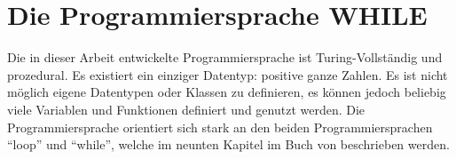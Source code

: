 \chapter{Die Programmiersprache WHILE} \label{chap:while}

Die in dieser Arbeit entwickelte Programmiersprache ist Turing-Vollständig und prozedural. Es existiert ein einziger Datentyp: positive ganze Zahlen. Es ist nicht möglich eigene Datentypen oder Klassen zu definieren, es können jedoch beliebig viele Variablen und Funktionen definiert und genutzt werden. Die Programmiersprache orientiert sich stark an den beiden Programmiersprachen \enquote{loop} und \enquote{while}, welche im neunten Kapitel im Buch  von \citeauthor{GottfriedVossen2016} beschrieben werden. \cite{GottfriedVossen2016} 



